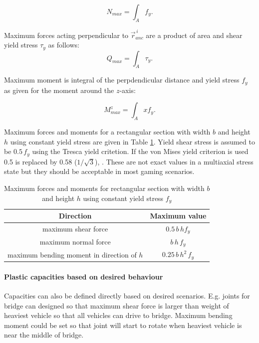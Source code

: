 \documentclass{jcgt}
\begin{document}
\begin{equation} \label{eq:fN}
N_{max}= \int_A f_y.
\end{equation}

Maximum forces acting perpendicular to $\vec{r}_{anc}^{\,i} $
are a product of area and shear yield stress $\tau_y$ as follows:
\begin{equation} \label{eq:fQ}
Q_{max}= \int_A \tau_y.
\end{equation}

Maximum moment is integral of the perpdendicular distance 
and yield stress $f_y$ as given for the moment around  the $z$-axis:

\begin{equation} \label{eq:Mz}
M_{max}^z= \int_A x f_y.
\end{equation}


Maximum forces and moments for a
rectangular section with width $b$ and height $h$ using constant yield stress
are given in Table \ref{tab:maxForces}.
Yield shear stress is assumed to be $ 0.5\, f_y$ using the Tresca yield critetion.
If the von Mises yield criterion is used 0.5 is replaced by 0.58 ($1/\sqrt{3}$), \cite{dowling}.
These are not exact values in a multiaxial stress state but they
should be acceptable in most gaming scenarios.

\begin {table}
\small
\begin{center}
\begin{tabular}{| c| c|}
\hline
{\bf Direction} & {\bf Maximum value}  \\ \hline
maximum shear force & $0.5\, b\, h f_y$ \\ \hline
maximum normal force & $b\, h\, f_y$  \\ \hline
maximum bending moment in direction of $h$& $0.25\, b\, h^2 \, f_y$  \\ \hline
\end{tabular}
\end{center}
\caption{Maximum forces and moments for 
rectangular section with width $b$ and height $h$ using constant yield stress $f_y$}
\label{tab:maxForces} 
\end {table}

\paragraph{Plastic capacities based on desired behaviour}
Capacities can also be defined directly based on desired scenarios.
E.g. joints for bridge can designed so that maximum shear force is larger than
weight of heaviest vehicle so that all vehicles can drive to bridge. Maximum 
bending moment could be set so that joint will start to rotate when heaviest vehicle is
near the middle of bridge.
\end{document}
